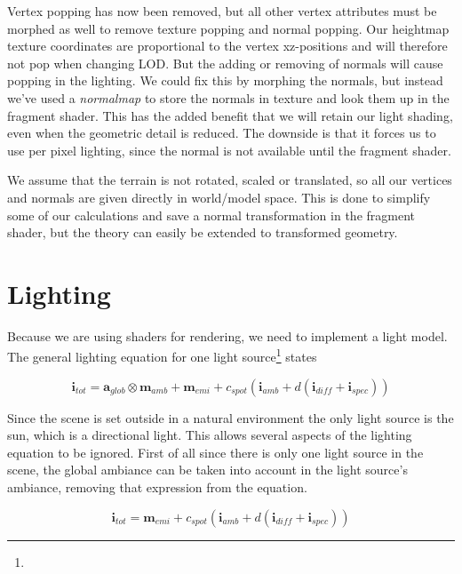 
Vertex popping has now been removed, but all other vertex attributes
must be morphed as well to remove texture popping and normal
popping. Our heightmap texture coordinates are proportional to the
vertex xz-positions and will therefore not pop when changing LOD. But
the adding or removing of normals will cause popping in the
lighting. We could fix this by morphing the normals, but instead we've
used a \emph{normalmap} to store the normals in texture and look them
up in the fragment shader. This has the added benefit that we will
retain our light shading, even when the geometric detail is
reduced. The downside is that it forces us to use per pixel lighting,
since the normal is not available until the fragment shader.

We assume that the terrain is not rotated, scaled or translated, so
all our vertices and normals are given directly in world/model
space. This is done to simplify some of our calculations and save a
normal transformation in the fragment shader, but the theory can
easily be extended to transformed geometry.

\section{Lighting}

Because we are using shaders for rendering, we need to implement a
light model. The general lighting equation for one light
source\footnote{} states

\begin{displaymath}
  \mathbf{i}_{tot} = \mathbf{a}_{glob} \otimes \mathbf{m}_{amb} +
  \mathbf{m}_{emi} + c_{spot}(\mathbf{i}_{amb} + d(\mathbf{i}_{diff} + \mathbf{i}_{spec}))
\end{displaymath}

Since the scene is set outside in a natural environment the only
light source is the sun, which is a directional light. This allows
several aspects of the lighting equation to be ignored. First of all
since there is only one light source in the scene, the global ambiance
can be taken into account in the light source's ambiance, removing that
expression from the equation.

\begin{displaymath}
  \mathbf{i}_{tot} = \mathbf{m}_{emi} + c_{spot}(\mathbf{i}_{amb} + d(\mathbf{i}_{diff} + \mathbf{i}_{spec}))
\end{displaymath}

